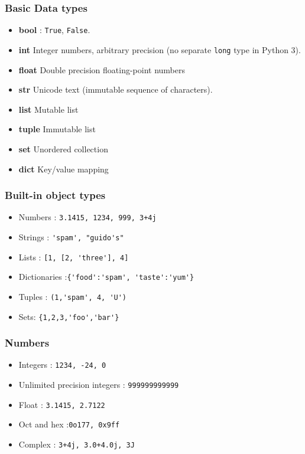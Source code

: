 \begin{frame}[fragile]\frametitle{Basic Data types}
  \begin{itemize}
  \item {\bf bool} : \texttt{True}, \texttt{False}.
  \item {\bf int} Integer numbers, arbitrary precision (no separate \texttt{long} type in Python 3).
  \item{\bf float} Double precision floating-point numbers
  \item {\bf str} Unicode text (immutable sequence of characters).
  \item{\bf list} Mutable list 
    \item{\bf tuple} Immutable list
        \item{\bf set} Unordered collection
  \item{\bf dict} Key/value mapping
  \end{itemize}
\end{frame}
\begin{frame}[fragile]\frametitle{Built-in object types}
  \begin{itemize}
  \item Numbers : \lstinline{3.1415, 1234, 999, 3+4j}
  \item Strings : \lstinline{'spam', "guido's"}
  \item Lists : \lstinline{[1, [2, 'three'], 4]}
   \item Dictionaries :\lstinline|{'food':'spam', 'taste':'yum'}|
  \item Tuples : \lstinline{(1,'spam', 4, 'U')}
  \item Sets: \lstinline|{1,2,3,'foo','bar'}|
  \end{itemize}
\end{frame}


\begin{frame}[fragile]\frametitle{Numbers}
  \begin{itemize}
  \item Integers : \lstinline{1234, -24, 0}
  \item Unlimited precision integers : \lstinline{999999999999}
  \item Float : \lstinline{3.1415, 2.7122}
   \item Oct and hex :\lstinline|0o177, 0x9ff|
  \item Complex : \lstinline{3+4j, 3.0+4.0j, 3J}
  \end{itemize}
\end{frame}




